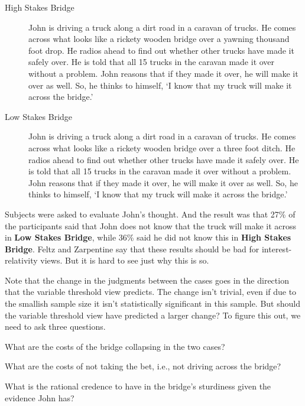 \begin{description}
\item[High Stakes Bridge] John is driving a truck along a dirt road in a caravan of trucks. He comes across what looks like a rickety wooden bridge over a yawning thousand foot drop. He radios ahead to find out whether other trucks have made it safely over. He is told that all 15 trucks in the caravan made it over without a problem. John reasons that if they made it over, he will make it over as well. So, he thinks to himself, `I know that my truck will make it across the bridge.'

\item[Low Stakes Bridge] John is driving a truck along a dirt road in a caravan of trucks. He comes across what looks like a rickety wooden bridge over a three foot ditch. He radios ahead to find out whether other trucks have made it safely over. He is told that all 15 trucks in the caravan made it over without a problem. John reasons that if they made it over, he will make it over as well. So, he thinks to himself, `I know that my truck will make it across the bridge.' \citep[??]{FeltzZarpentine2010}
\end{description}

\noindent Subjects were asked to evaluate John's thought. And the result was that 27\% of the participants said that John does not know that the truck will make it across in \textbf{Low Stakes Bridge}, while 36\% said he did not know this in \textbf{High Stakes Bridge}. Feltz and Zarpentine say that these results should be bad for interest-relativity views. But it is hard to see just why this is so.

Note that the change in the judgments between the cases goes in the direction that the variable threshold view predicts. The change isn't trivial, even if due to the smallish sample size it isn't statistically significant in this sample. But should the variable threshold view have predicted a larger change? To figure this out, we need to ask three questions.

\begin{enumerate*}
\item What are the costs of the bridge collapsing in the two cases?
\item What are the costs of not taking the bet, i.e., not driving across the bridge?
\item What is the rational credence to have in the bridge's sturdiness given the evidence John has?
\end{enumerate*}

